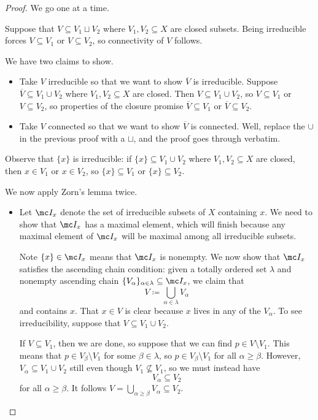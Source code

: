 \documentclass[../notes.tex]{subfiles}
\begin{document}
\begin{proof}
	We go one at a time.
	\begin{listalph}
		\item Suppose that $V\subseteq V_1\sqcup V_2$ where $V_1,V_2\subseteq X$ are closed subsets. Being irreducible forces $V\subseteq V_1$ or $V\subseteq V_2$, so connectivity of $V$ follows.
		\item We have two claims to show.
		\begin{itemize}
			\item Take $V$ irreducible so that we want to show $\overline V$ is irreducible. Suppose $\overline V\subseteq V_1\cup V_2$ where $V_1,V_2\subseteq X$ are closed. Then $V\subseteq V_1\cup V_2$, so $V\subseteq V_1$ or $V\subseteq V_2$, so properties of the closure promise $\overline V\subseteq V_1$ or $\overline V\subseteq V_2$.
			\item Take $V$ connected so that we want to show $\overline V$ is connected. Well, replace the $\cup$ in the previous proof with a $\sqcup$, and the proof goes through verbatim.
		\end{itemize}
		\item Observe that $\{x\}$ is irreducible: if $\{x\}\subseteq V_1\cup V_2$ where $V_1,V_2\subseteq X$ are closed, then $x\in V_1$ or $x\in V_2$, so $\{x\}\subseteq V_1$ or $\{x\}\subseteq V_2$.

		We now apply Zorn's lemma twice.
		\begin{itemize}
			\item Let $\mc I_x$ denote the set of irreducible subsets of $X$ containing $x$. We need to show that $\mc I_x$ has a maximal element, which will finish because any maximal element of $\mc I_x$ will be maximal among all irreducible subsets.
			
			Note $\{x\}\in\mc I_x$ means that $\mc I_x$ is nonempty. We now show that $\mc I_x$ satisfies the ascending chain condition: given a totally ordered set $\lambda$ and nonempty ascending chain $\{V_\alpha\}_{\alpha\in\lambda}\subseteq\mc I_x$, we claim that
			\[V\coloneqq\bigcup_{\alpha\in\lambda}V_\alpha\]
			and contains $x$. That $x\in V$ is clear because $x$ lives in any of the $V_\alpha$. To see irreducibility, suppose that $V\subseteq V_1\cup V_2$.
			
			If $V\subseteq V_1$, then we are done, so suppose that we can find $p\in V\setminus V_1$. This means that $p\in V_\beta\setminus V_1$ for some $\beta\in\lambda$, so $p\in V_\beta\setminus V_1$ for all $\alpha\ge\beta$. However, $V_\alpha\subseteq V_1\cup V_2$ still even though $V_1\not\subseteq V_1$, so we must instead have
			\[V_\alpha\subseteq V_2\]
			for all $\alpha\ge\beta$. It follows $V=\bigcup_{\alpha\ge\beta}V_\alpha\subseteq V_2$.


\end{itemize}
\end{listalph}
\end{proof}
\end{document}
